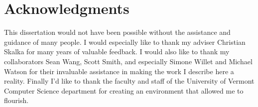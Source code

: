 

\doublespace
{}
\chapter*{Acknowledgments}

This dissertation would not have been possible without the assistance and guidance of many
people. I would especially like to thank my adviser Christian Skalka for many years of valuable
feedback. I would also like to thank my collaborators Sean Wang, Scott Smith, and especially
Simone Willet and Michael Watson for their invaluable assistance in making the work I describe
here a reality. Finally I'd like to thank the faculty and staff of the University of Vermont
Computer Science department for creating an environment that allowed me to flourish.

\primaryspacing
